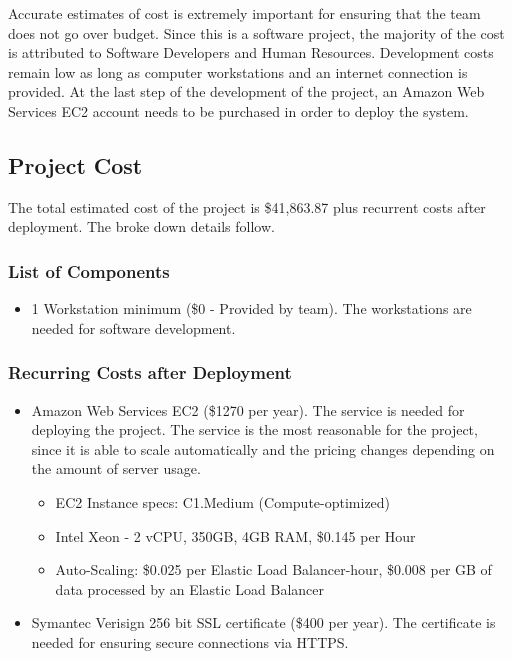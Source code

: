 \label{sec:Budget}

Accurate estimates of cost is extremely important for ensuring that the team
does not go over budget. Since this is a software project, the majority of the
cost is attributed to Software Developers and Human Resources. Development costs
remain low as long as computer workstations and an internet connection is
provided. At the last step of the development of the project, an Amazon Web
Services EC2 account needs to be purchased in order to deploy the system.

\subsection{Project Cost}
The total estimated cost of the project is \$41,863.87 plus recurrent costs
after deployment. The broke down details follow.

\subsubsection{List of Components}
\begin{itemize}
\item 1 Workstation minimum (\$0 - Provided by team). The workstations are
needed for software development.
\end{itemize}

\subsubsection{Recurring Costs after Deployment}
\begin{itemize}
\item Amazon Web Services EC2 (\$1270 per year). The service is needed for
deploying the project. The service is the most reasonable for the project, since
it is able to scale automatically and the pricing changes depending on the
amount of server usage.
\begin{itemize}
\item EC2 Instance specs: C1.Medium (Compute-optimized)
\item Intel Xeon - 2 vCPU, 350GB, 4GB RAM, \$0.145 per Hour
\item Auto-Scaling: \$0.025 per Elastic Load Balancer-hour, \$0.008 per GB of data processed by an Elastic Load Balancer
\end{itemize}


\item Symantec Verisign 256 bit SSL certificate (\$400 per year). The
certificate is needed for ensuring secure connections via HTTPS.
\end{itemize}

